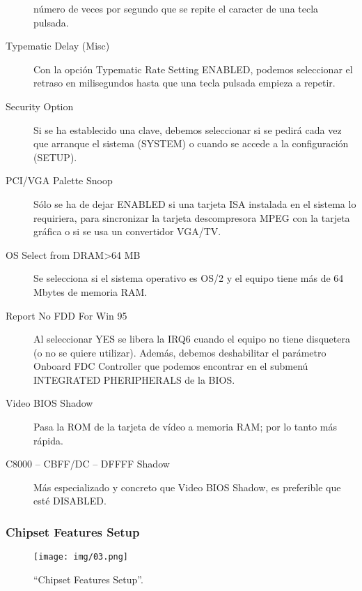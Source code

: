 \documentclass[12pt,oneside,a4paper]{article}
\begin{document}
\begin{description}
					número de veces por segundo que se repite el caracter de
					una tecla pulsada.
				\item[Typematic Delay (Misc)] Con la opción Typematic Rate
					Setting ENABLED, podemos seleccionar el retraso en
					milisegundos hasta que una tecla pulsada empieza a repetir.
				\item[Security Option] Si se ha establecido una clave, debemos
					seleccionar si se pedirá cada vez que arranque el sistema
					(SYSTEM) o cuando se accede a la configuración (SETUP).
				\item[PCI/VGA Palette Snoop] Sólo se ha de dejar ENABLED si una
					tarjeta ISA instalada en el sistema lo requiriera, para
					sincronizar la tarjeta descompresora MPEG con la tarjeta
					gráfica o si se usa un convertidor VGA/TV.
				\item[OS Select from DRAM>64 MB] Se selecciona si el sistema
					operativo es OS/2 y el equipo tiene más de 64 Mbytes de
					memoria RAM.
				\item[Report No FDD For Win 95] Al seleccionar YES se libera la
					IRQ6 cuando el equipo no tiene disquetera (o no se quiere
					utilizar). Además, debemos deshabilitar el parámetro
					Onboard FDC Controller que podemos encontrar en el submenú
					INTEGRATED PHERIPHERALS de la BIOS.
				\item[Video BIOS Shadow] Pasa la ROM de la tarjeta de vídeo a
					memoria RAM; por lo tanto más rápida.
				\item[C8000 – CBFF/DC – DFFFF Shadow] Más especializado y
					concreto que Video BIOS Shadow, es preferible que esté
					DISABLED.
			\end{description}

		\subsubsection{Chipset Features Setup}{\label{sub:chipset features setup}}
			\begin{figure}[H]
				\centering
					\texttt{[image: img/03.png]}
				\caption{``Chipset Features Setup''.}
			\end{figure}
			
\end{document}
